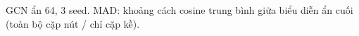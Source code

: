 GCN ẩn 64, 3 seed. MAD: khoảng cách cosine trung bình giữa biểu diễn ẩn cuối (toàn bộ cặp nút / chỉ cặp kề).
